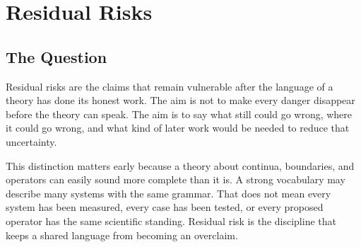 \documentclass[11pt,a4paper,openany]{book}
\begin{document}
\section{Residual Risks}
\subsection{The Question}
Residual risks are the claims that remain vulnerable after the language of a theory has done its honest work. The aim is not to make every danger disappear before the theory can speak. The aim is to say what still could go wrong, where it could go wrong, and what kind of later work would be needed to reduce that uncertainty. \cite{kauffman_autocatalytic,raf_networks}\par
This distinction matters early because a theory about continua, boundaries, and operators can easily sound more complete than it is. A strong vocabulary may describe many systems with the same grammar. That does not mean every system has been measured, every case has been tested, or every proposed operator has the same scientific standing. Residual risk is the discipline that keeps a shared language from becoming an overclaim.\par
\end{document}
